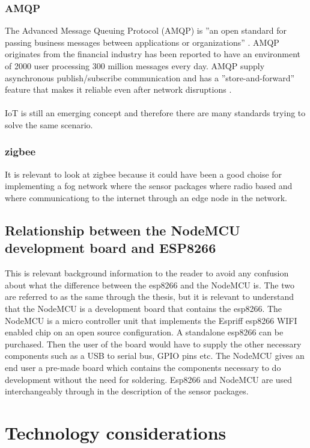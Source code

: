 \documentclass[]{uiophd}
\begin{document}
\subsection{AMQP}
The Advanced Message Queuing Protocol (AMQP) is ''an open standard for passing business messages between applications or organizations'' \cite{amqp}. AMQP originates from the financial industry has been reported to have an environment of 2000 user processing 300 million messages every day. AMQP supply asynchronous publish/subscribe communication and has a ''store-and-forward'' feature that makes it reliable even after network disruptions \cite{karagiannis2015survey}. 
\\\\
IoT is still an emerging concept and therefore there are many standards trying to solve the same scenario.

\subsection{zigbee}
It is relevant to look at zigbee because it could have been a good choise for implementing a fog network where the sensor packages where radio based and where communicationg to the internet through an edge node in the network.

\section{Relationship between the NodeMCU development board and ESP8266}
This is relevant background information to the reader to avoid any confusion about what the difference between the esp8266 and the NodeMCU is. The two are referred to as the same through the thesis, but it is relevant to understand that the NodeMCU is a development board that contains the esp8266. The NodeMCU is a micro controller unit that implements the Espriff esp8266 WIFI enabled chip on an open source configuration. A standalone esp8266 can be purchased. Then the user of the board would have to supply the other necessary components such as a USB to serial bus, GPIO pins etc. The NodeMCU gives an end user a pre-made board which contains the components necessary to do development without the need for soldering. Esp8266 and NodeMCU are used interchangeably through in the description of the sensor packages.

\chapter{Technology considerations}
\end{document}
